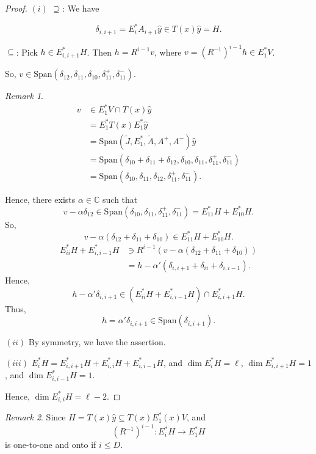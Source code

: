 \documentclass[
]{book}
\theoremstyle{definition}
\theoremstyle{definition}
\theoremstyle{definition}
\theoremstyle{definition}
\theoremstyle{remark}
\newtheorem*{remark}{Remark}
\begin{document}
\begin{proof}
\leavevmode

\((i)\) \(\supseteq\): We have

\[\delta_{i,i+1} = E^*_iA_{i+1}\hat{y} \in T(x)\hat{y} = H.\]

\(\subseteq\): Pick \(h\in E^*_{i,i+1}H\). Then \(h = R^{i-1}v\), where \(v = (R^{-1})^{i-1}h\in E^*_1V\).

So, \(v\in \mathrm{Span}(\delta_{12}, \delta_{11}, \delta_{10}, \delta^+_{11}, \delta^-_{11})\).

\begin{remark}
\begin{align}
v &\in E^*_1V \cap T(x)\hat{y}\\
& = E^*_1T(x)E^*_1\hat{y}\\
& = \mathrm{Span}(\tilde{J}, E^*_1, \tilde{A}, A^+, A^-)\hat{y}\\
& = \mathrm{Span}(\delta_{10}+ \delta_{11}+ \delta_{12}, \delta_{10}, \delta_{11}, \delta^+_{11}, \delta^-_{11})\\
& = \mathrm{Span}(\delta_{10}, \delta_{11},  \delta_{12}, \delta^+_{11}, \delta^-_{11}).
\end{align}
\end{remark}

Hence, there exists \(\alpha \in \mathbb{C}\) such that
\[v-\alpha \delta_{12}  \in \mathrm{Span}(\delta_{10}, \delta_{11}, \delta^+_{11}, \delta^-_{11}) = E^*_{11}H + E^*_{10}H.\]
So,
\[v-\alpha(\delta_{12} + \delta_{11} + \delta_{10}) \in E^*_{11}H + E^*_{10}H.\]
\begin{align}
E^*_{ii}H + E^*_{i,i-1}H & \ni R^{i-1}(v-\alpha(\delta_{12}+\delta_{11}+\delta_{10}))\\
& = h - \alpha'(\delta_{i,i+1}+\delta_{ii}+\delta_{i,i-1}).
\end{align}
Hence,
\[h-\alpha'\delta_{i,i+1}\in (E^*_{ii}H + E^*_{i,i-1}H)\cap E^*_{i,i+1}H.\]
Thus,
\[h = \alpha'\delta_{i,i+1} \in \mathrm{Span}(\delta_{i,i+1}).\]

\((ii)\) By symmetry, we have the assertion.

\((iii)\) \(E^*_i H = E^*_{i,i+1}H + E^*_{i,i}H + E^*_{i,i-1}H\), and \(\dim E^*_iH = \ell\), \(\dim E^*_{i,i+1}H =1\), and \(\dim E^*_{i,i-1}H = 1\).

Hence, \(\dim E^*_{i,i}H = \ell -2\).

\end{proof}

\begin{remark}
Since \(H = T(x)\hat{y} \subseteq T(x)E^*_{1}(x)V\), and
\[(R^{-1})^{i-1}: E^*_iH \to E^*_1H\]
is one-to-one and onto if \(i\leq D\).
\end{remark}
\end{document}
